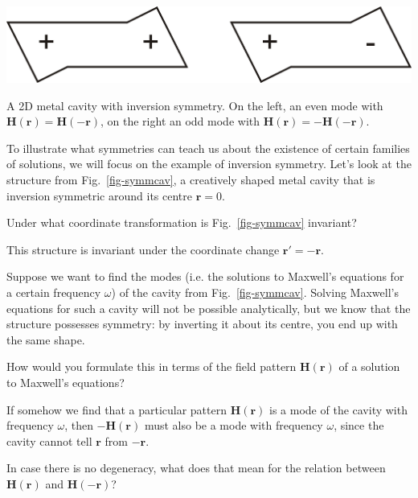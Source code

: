 \begin{marginfigure}
\centering
\includegraphics{symmetry/figures/symmcav}
\caption{A 2D metal cavity with inversion symmetry. On the left, an even mode with ${\mathbf H}({\mathbf r}) = {\mathbf H}(-{\mathbf r})$, on the right an odd mode with ${\mathbf H}({\mathbf r})=-{\mathbf H}(-{\mathbf r})$.}
\label{fig-symmcav}
\end{marginfigure}

To illustrate what symmetries can teach us about the existence of certain families of solutions, we will focus on the example of inversion symmetry. Let's look at the structure from Fig.~\ref{fig-symmcav}, a creatively shaped metal cavity that is inversion symmetric around its centre $\mathbf{r}=0$.

\begin{cue}
Under what coordinate transformation is Fig.~\ref{fig-symmcav} invariant?   
\end{cue}

This structure is invariant under the coordinate change ${\mathbf r}' = -{\mathbf r}$.

Suppose we want to find the modes (i.e. the solutions to Maxwell's equations for a certain frequency $\omega$) of the cavity from Fig.~\ref{fig-symmcav}. Solving Maxwell's equations for such a cavity will not be possible analytically, but we know that the structure possesses symmetry: by inverting it about its centre, you end up with the same shape.

\begin{cue}
How would you formulate this in terms of the field pattern ${\mathbf H({\mathbf r})}$ of a solution to Maxwell's equations?    
\end{cue}

If somehow we find that a particular pattern ${\mathbf H({\mathbf r})}$ is a mode of the cavity with frequency $\omega$, then ${-\mathbf H({\mathbf r})}$ must also be a mode with frequency $\omega$, since the cavity cannot tell ${\mathbf r}$ from ${-\mathbf{r}}$.

\begin{cue}
In case there is no degeneracy, what does that mean for the relation between ${\mathbf H({\mathbf r})}$ and ${\mathbf H({\mathbf{-r}})}$?    
\end{cue}

